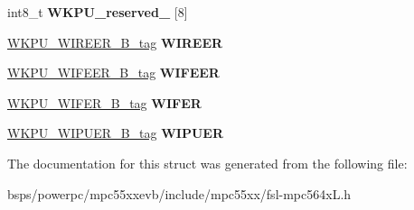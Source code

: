 \begin{DoxyCompactItemize}
\item 
\mbox{\label{structWKPU__struct__tag_ae9ea6aedf2186907660b120abe69d093}} 
int8\+\_\+t {\bfseries W\+K\+P\+U\+\_\+reserved\+\_} \mbox{[}8\mbox{]}
\item 
\mbox{\label{structWKPU__struct__tag_a6a841c1fe5f819bf08b6054a45c90e03}} 
\mbox{\hyperlink{unionWKPU__WIREER__32B__tag}{W\+K\+P\+U\+\_\+\+W\+I\+R\+E\+E\+R\+\_\+B\+\_\+tag}} {\bfseries W\+I\+R\+E\+ER}
\item 
\mbox{\label{structWKPU__struct__tag_a4083b1e74392fb1e79ecd7a1f47ab514}} 
\mbox{\hyperlink{unionWKPU__WIFEER__32B__tag}{W\+K\+P\+U\+\_\+\+W\+I\+F\+E\+E\+R\+\_\+B\+\_\+tag}} {\bfseries W\+I\+F\+E\+ER}
\item 
\mbox{\label{structWKPU__struct__tag_af4f2b2e8ebb887f91f00e4df0618e121}} 
\mbox{\hyperlink{unionWKPU__WIFER__32B__tag}{W\+K\+P\+U\+\_\+\+W\+I\+F\+E\+R\+\_\+B\+\_\+tag}} {\bfseries W\+I\+F\+ER}
\item 
\mbox{\label{structWKPU__struct__tag_a1c86c817a39e36f597de75bdbed55431}} 
\mbox{\hyperlink{unionWKPU__WIPUER__32B__tag}{W\+K\+P\+U\+\_\+\+W\+I\+P\+U\+E\+R\+\_\+B\+\_\+tag}} {\bfseries W\+I\+P\+U\+ER}
\end{DoxyCompactItemize}


The documentation for this struct was generated from the following file\+:\begin{DoxyCompactItemize}
\item 
bsps/powerpc/mpc55xxevb/include/mpc55xx/fsl-\/mpc564x\+L.\+h\end{DoxyCompactItemize}
